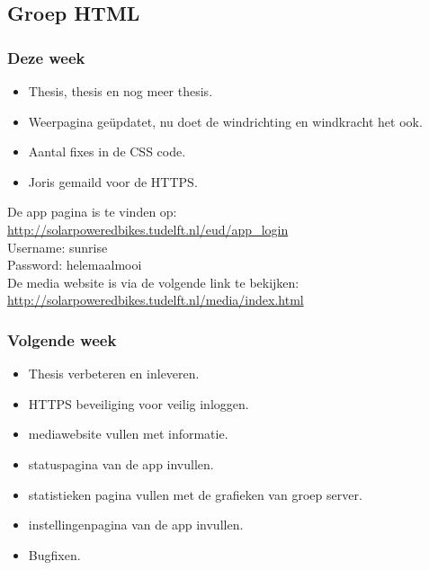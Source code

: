 \subsection*{Groep HTML}
\subsubsection*{Deze week}
\begin{itemize}
\item Thesis, thesis en nog meer thesis.
\item Weerpagina ge\"updatet, nu doet de windrichting en windkracht het ook.
\item Aantal fixes in de CSS code.
\item Joris gemaild voor de HTTPS.

\end{itemize}

\noindent De app pagina is te vinden op:\\ \url{http://solarpoweredbikes.tudelft.nl/eud/app_login}\\

\noindent Username: sunrise\\
\noindent Password: helemaalmooi\\

\noindent De media website is via de volgende link te bekijken:\\
\url{http://solarpoweredbikes.tudelft.nl/media/index.html}\\

\subsubsection*{Volgende week}
\begin{itemize}
\item Thesis verbeteren en inleveren.
\item HTTPS beveiliging voor veilig inloggen.
\item mediawebsite vullen met informatie.
\item statuspagina van de app invullen.
\item statistieken pagina vullen met de grafieken van groep server.
\item instellingenpagina van de app invullen.
\item Bugfixen.

\end{itemize}
